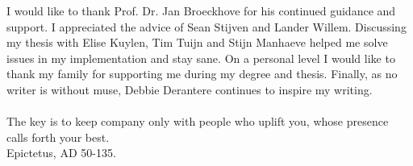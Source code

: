 I would like to thank Prof. Dr. Jan Broeckhove for his continued guidance and support. 
I appreciated the advice of Sean Stijven and Lander Willem.
Discussing my thesis with Elise Kuylen, Tim Tuijn and Stijn Manhaeve helped me solve issues in my implementation and stay sane. On a personal level I would like to thank my family for supporting me during my degree and thesis. 
Finally, as no writer is without muse, Debbie Derantere continues to inspire my writing. \\
\paragraph{}
The key is to keep company only with people who uplift you, whose presence calls forth your best.\\
Epictetus, AD 50-135.